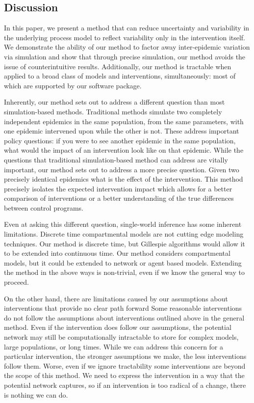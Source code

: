 \documentclass[PTRSB]{rsos}
\begin{document}
\begin{multicols}{2}
\section{Discussion}
In this paper, we present a method that can reduce uncertainty and variability in the underlying process model to reflect variability only in the intervention itself.
We demonstrate the ability of our method to factor away inter-epidemic variation via simulation and show that through precise simulation, our method avoids the issue of counterintuitive results. 
Additionally, our method is tractable when applied to a broad class of models and interventions, simultaneously: most of which are supported by our software package.

Inherently, our method sets out to address a different question than most simulation-based methods. 
Traditional methods simulate two completely independent epidemics in the same population, from the same parameters, with one epidemic intervened upon while the other is not. 
These address important policy questions: if you were to see another epidemic in the same population, what would the impact of an intervention look like on that epidemic. 
While the questions that traditional simulation-based method can address are vitally important, our method sets out to address a more precise question. 
Given two precisely identical epidemics what is the effect of the intervention. 
This method precisely isolates the expected intervention impact which allows for a better comparison of interventions or a better understanding of the true differences between control programs.

Even at asking this different question, single-world inference has some inherent limitations.
Discrete time compartmental models are not cutting edge modeling techniques.
Our method is discrete time, but Gillespie algorithms would allow it to be extended into continuous time.
Our method considers compartmental models, but it could be extended to network or agent based models.
Extending the method in the above ways is non-trivial, even if we know the general way to proceed.

On the other hand, there are limitations caused by our assumptions about interventions that provide no clear path forward
Some reasonable interventions do not follow the assumptions about interventions outlined above in the general method.
Even if the intervention does follow our assumptions, the potential network may still be computationally intractable to store for complex models, large populations, or long times.
While we can address this concern for a particular intervention, the stronger assumptions we make, the less interventions follow them.
Worse, even if we ignore tractability some interventions are beyond the scope of this method.
We need to express the intervention in a way that the potential network captures, so if an intervention is too radical of a change, there is nothing we can do.


\end{multicols}
\end{document}
